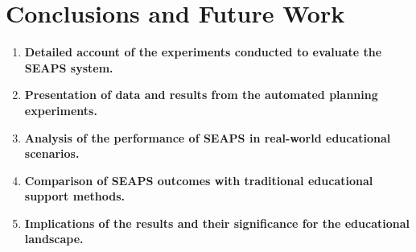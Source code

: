 \section{Conclusions and Future Work}
\begin{enumerate}
    \item \textbf{Detailed account of the experiments conducted to evaluate the SEAPS system.}
    \item \textbf{Presentation of data and results from the automated planning experiments.}
    \item \textbf{Analysis of the performance of SEAPS in real-world educational scenarios.}
    \item \textbf{Comparison of SEAPS outcomes with traditional educational support methods.}
    \item \textbf{Implications of the results and their significance for the educational landscape.}
\end{enumerate}
